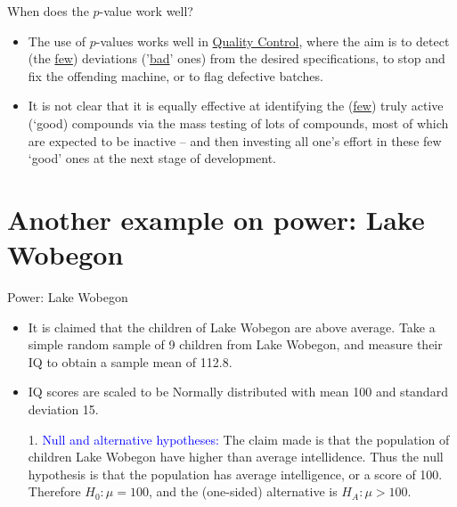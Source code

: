 \documentclass[10pt]{beamer}\usepackage[]{graphicx}\usepackage[]{color}
\begin{document}
\begin{frame}{When does the $p$-value work well?}
	\begin{itemize}
		\small
		\setlength\itemsep{1em}
		\item The use of $p$-values works well in \underline{Quality Control}, where the aim is to detect
		(the \underline{few})  deviations ('\underline{bad}' ones)  from the desired specifications, to stop and fix	the offending machine, or to flag defective batches. \pause 
		\item It is not clear that it is equally effective at identifying the (\underline{few}) truly active (`{good}) compounds	via the mass testing of lots of compounds, most of which are expected to be inactive -- and then investing all one's effort in these few `good' ones at the next stage of development.
	\end{itemize}
\end{frame}


\section{Another example on power: Lake Wobegon}

\begin{frame}[fragile]{Power: Lake Wobegon}
	\small
	\begin{itemize}
		\item It is claimed that the children of Lake Wobegon are above
		average. Take a simple random sample of 9 children from Lake
		Wobegon, and measure their IQ to obtain a sample mean of 112.8. 
		\item IQ scores are scaled to be Normally distributed with mean 100 and
		standard deviation 15. 
		\item[]\item[1.] \textcolor{blue}{Null and alternative hypotheses:} The claim made is
		that the population of children Lake Wobegon have higher than
		average intellidence. Thus the null hypothesis is that the
		population has average intelligence, or a score of 100. Therefore
		$H_0: \mu=100$, and the (one-sided) alternative is $H_A: \mu >
		100$.
	\end{itemize}
\end{frame}
\end{document}
